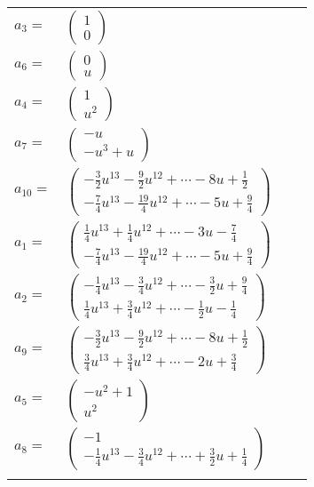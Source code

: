 \documentclass[1p]{elsarticle_modified}
\theoremstyle{definition}
\begin{document}
\begin{tabular}{m{7pt} m{180pt} m{7pt} m{180pt} }
\flushright $a_{3}=$&$\begin{pmatrix}1\\0\end{pmatrix}$ \\
\flushright $a_{6}=$&$\begin{pmatrix}0\\u\end{pmatrix}$ \\
\flushright $a_{4}=$&$\begin{pmatrix}1\\u^2\end{pmatrix}$ \\
\flushright $a_{7}=$&$\begin{pmatrix}- u\\- u^3+u\end{pmatrix}$ \\
\flushright $a_{10}=$&$\begin{pmatrix}-\frac{3}{2} u^{13}-\frac{9}{2} u^{12}+\cdots-8 u+\frac{1}{2}\\-\frac{7}{4} u^{13}-\frac{19}{4} u^{12}+\cdots-5 u+\frac{9}{4}\end{pmatrix}$ \\
\flushright $a_{1}=$&$\begin{pmatrix}\frac{1}{4} u^{13}+\frac{1}{4} u^{12}+\cdots-3 u-\frac{7}{4}\\-\frac{7}{4} u^{13}-\frac{19}{4} u^{12}+\cdots-5 u+\frac{9}{4}\end{pmatrix}$ \\
\flushright $a_{2}=$&$\begin{pmatrix}-\frac{1}{4} u^{13}-\frac{3}{4} u^{12}+\cdots-\frac{3}{2} u+\frac{9}{4}\\\frac{1}{4} u^{13}+\frac{3}{4} u^{12}+\cdots-\frac{1}{2} u-\frac{1}{4}\end{pmatrix}$ \\
\flushright $a_{9}=$&$\begin{pmatrix}-\frac{3}{2} u^{13}-\frac{9}{2} u^{12}+\cdots-8 u+\frac{1}{2}\\\frac{3}{4} u^{13}+\frac{3}{4} u^{12}+\cdots-2 u+\frac{3}{4}\end{pmatrix}$ \\
\flushright $a_{5}=$&$\begin{pmatrix}- u^2+1\\u^2\end{pmatrix}$ \\
\flushright $a_{8}=$&$\begin{pmatrix}-1\\-\frac{1}{4} u^{13}-\frac{3}{4} u^{12}+\cdots+\frac{3}{2} u+\frac{1}{4}\end{pmatrix}$\\&\end{tabular}
\end{document}
